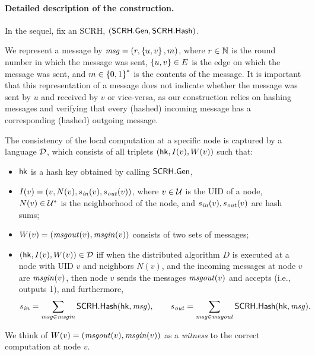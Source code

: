 
\paragraph{Detailed description of the construction.}
In the sequel, fix an SCRH, $(\mathsf{SCRH}.\mathsf{Gen}, \mathsf{SCRH}.\mathsf{Hash})$.

We represent a message by $\mathit{ msg } = (r, \left \{{u, v} \right \}, m)$,
where $r \in \mathbb{N}$ is the round number in which the message was sent,
$\left \{{u,v} \right \} \in E$ is the edge on which the message was sent,
and $m \in \left \{{0,1} \right \}^*$ is the contents of the message.
It is important that this representation of a message does not indicate whether the message was sent by $u$ and received by $v$ or vice-versa,
as our construction relies on hashing messages and verifying that every (hashed) incoming message has a corresponding (hashed) outgoing message.

The consistency of the local computation at a specific node is captured
by a
language $\mathcal{D}$,
which consists of all triplets $(\mathsf{hk}, I(v), W(v))$ such that:
\begin{itemize}
	\item $\mathsf{hk}$ is a hash key obtained by calling $\mathsf{SCRH}.\mathsf{Gen}$,
	\item $I(v) = (v, N(v), s_{\mathit{ in }}(v), s_{\mathit{ out }}(v))$,
		where
		$v \in \mathcal{U}$ is the UID of a node,
		$N(v) \in \mathcal{U}^{\ast}$ is the neighborhood of the node,
		and $s_{\mathit{ in }}(v), s_{\mathit{ out }}(v)$ are hash sums;
	\item $W(v) = (\mathit{ msgout }(v), \mathit{ msgin }(v))$ consists of two sets of messages;
	\item $(\mathsf{hk}, I(v), W(v)) \in \mathcal{D}$ iff when the distributed algorithm $D$ is executed 
at a node with UID $v$ and neighbors $N(v)$,
and the incoming messages at node $v$ are $\mathit{ msgin }(v)$,
then node $v$ sends the messages $\mathit{ msgout }(v)$
and accepts (i.e., outputs 1),
and furthermore,
\begin{equation}
	s_{\mathit{ in }} = \sum_{\mathit{ msg } \in \mathit{ msgin }} \mathsf{SCRH}.\mathsf{Hash}(\mathsf{hk}, \mathit{ msg }),
	\qquad
	s_{\mathit{ out }} = \sum_{\mathit{ msg } \in \mathit{ msgout }} \mathsf{SCRH}.\mathsf{Hash}(\mathsf{hk}, \mathit{ msg }).
\end{equation}
\end{itemize}
We think of $W(v) = (\mathit{ msgout }(v), \mathit{ msgin }(v))$ as a \emph{witness}
to the correct computation at node $v$.

